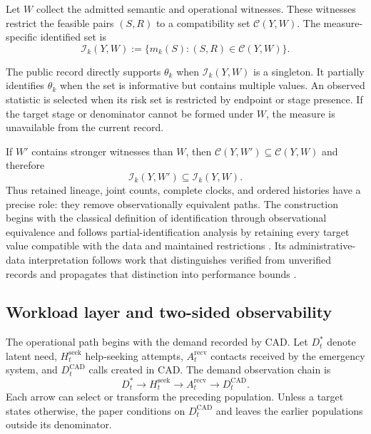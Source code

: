 \documentclass[11pt]{article}
\begin{document}
Let $W$ collect the admitted semantic and operational witnesses. These witnesses restrict the feasible pairs $(S,R)$ to a compatibility set $\mathcal C(Y,W)$. The measure-specific identified set is
\begin{equation}
\mathcal I_k(Y,W)
:=
\{m_k(S):(S,R)\in\mathcal C(Y,W)\}.
\label{eq:measure_identified_set}
\end{equation}

\begin{plainbox}[title=Measure-specific identification rule]
The public record directly supports $\theta_k$ when $\mathcal I_k(Y,W)$ is a singleton. It partially identifies $\theta_k$ when the set is informative but contains multiple values. An observed statistic is selected when its risk set is restricted by endpoint or stage presence. If the target stage or denominator cannot be formed under $W$, the measure is unavailable from the current record.
\end{plainbox}

If $W'$ contains stronger witnesses than $W$, then $\mathcal C(Y,W')\subseteq\mathcal C(Y,W)$ and therefore
\begin{equation}
\mathcal I_k(Y,W')\subseteq\mathcal I_k(Y,W).
\label{eq:witness_contraction}
\end{equation}
Thus retained lineage, joint counts, complete clocks, and ordered histories have a precise role: they remove observationally equivalent paths. The construction begins with the classical definition of identification through observational equivalence \citep{KoopmansReiersol1950,Rothenberg1971,Lewbel2019} and follows partial-identification analysis by retaining every target value compatible with the data and maintained restrictions \citep{Manski1989,Manski1990,Manski2003,Molinari2020}. Its administrative-data interpretation follows work that distinguishes verified from unverified records and propagates that distinction into performance bounds \citep{DominitzSherman2006,KapteynYpma2007,Manski2015}.

\subsection{Workload layer and two-sided observability}
\label{sec:workload_observability}

The operational path begins with the demand recorded by CAD. Let $D_t^*$ denote latent need, $H_t^{\mathrm{seek}}$ help-seeking attempts, $A_t^{\mathrm{recv}}$ contacts received by the emergency system, and $D_t^{\mathrm{CAD}}$ calls created in CAD. The demand observation chain is
\begin{equation}
D_t^*
\longrightarrow H_t^{\mathrm{seek}}
\longrightarrow A_t^{\mathrm{recv}}
\longrightarrow D_t^{\mathrm{CAD}}.
\label{eq:demand_chain}
\end{equation}
Each arrow can select or transform the preceding population. Unless a target states otherwise, the paper conditions on $D_t^{\mathrm{CAD}}$ and leaves the earlier populations outside its denominator.
\end{document}

